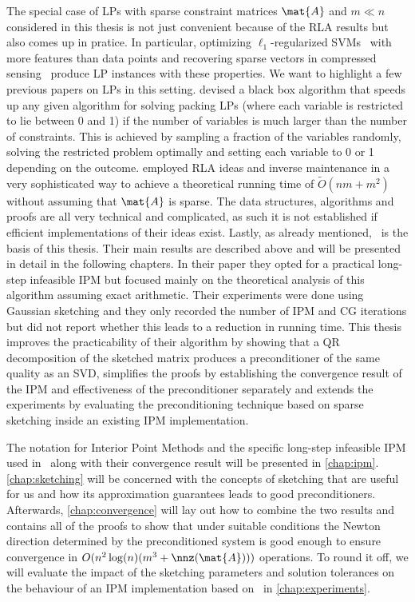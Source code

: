 The special case of LPs with sparse constraint matrices \(\mat{A}\) and \(m \ll n\) considered in this thesis is not just convenient because of the RLA results but also comes up in pratice.
In particular, optimizing \(\ell_1\)-regularized SVMs~\cite{ZhuRossetTibshiraniHastie-1normSupportVectorMachines} with more features than data points and recovering sparse vectors in compressed sensing~\cite{YangZhang-l1ProblemsInCompressiveSensing} produce LP instances with these properties.
We want to highlight a few previous papers on LPs in this setting. \textcite{LondonVardiWiermanYi-PackingLinearPrograms} devised a black box algorithm that speeds up any given algorithm for solving packing LPs (where each variable is restricted to lie between 0 and 1) if the number of variables is much larger than the number of constraints.
This is achieved by sampling a fraction of the variables randomly, solving the restricted problem optimally and setting each variable to 0 or 1 depending on the outcome.
\textcite{Sidford-TallDenseLinearPrograms} employed RLA ideas and inverse maintenance in a very sophisticated way to achieve a theoretical running time of \(\tilde{O}(nm + m^2)\) without assuming that \(\mat{A}\) is sparse.
The data structures, algorithms and proofs are all very technical and complicated, as such it is not established if efficient implementations of their ideas exist.
Lastly, as already mentioned,~\cite{Avron-FasterRandomizedInfeasibleIPMs} is the basis of this thesis.
Their main results are described above and will be presented in detail in the following chapters.
In their paper they opted for a practical long-step infeasible IPM but focused mainly on the theoretical analysis of this algorithm assuming exact arithmetic.
Their experiments were done using Gaussian sketching and they only recorded the number of IPM and CG iterations but did not report whether this leads to a reduction in running time.
This thesis improves the practicability of their algorithm by showing that a QR decomposition of the sketched matrix produces a preconditioner of the same quality as an SVD, simplifies the proofs by establishing the convergence result of the IPM and effectiveness of the preconditioner separately and extends the experiments by evaluating the preconditioning technique based on sparse sketching inside an existing IPM implementation.

The notation for Interior Point Methods and the specific long-step infeasible IPM used in~\cite{Monteiro-ConvergenceAnalysisLongStepInfeasibleIPMs} along with their convergence result will be presented in \cref{chap:ipm}.
\cref{chap:sketching} will be concerned with the concepts of sketching that are useful for us and how its approximation guarantees leads to good preconditioners.
Afterwards, \cref{chap:convergence} will lay out how to combine the two results and contains all of the proofs to show that under suitable conditions the Newton direction determined by the preconditioned system is good enough to ensure convergence in \(O(n^2 \log(n) (m^3 + \nnz(\mat{A})))\) operations.
To round it off, we will evaluate the impact of the sketching parameters and solution tolerances on the behaviour of an IPM implementation based on~\cite{AndersenAndersen-MosekInteriorPointMethod} in \cref{chap:experiments}.
